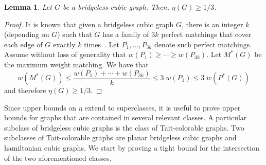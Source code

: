 \documentclass{article}
\newtheorem{lem}[thm]{Lemma}
\begin{document}
\begin{lem} \label{lem:lb}
Let $G$ be a bridgeless cubic graph. Then, $\eta(G) \geq 1/3$.
\end{lem}
\begin{proof}
It is known that given a bridgeless cubic graph $G$, there is an integer $k$ (depending on $G$) such that $G$ has a family of $3k$ perfect matchings that cover each edge of $G$ exactly $k$ times~\cite{edmonds65}. Let $P_1,\ldots,P_{3k}$ denote such perfect matchings. Assume without loss of generality that $w(P_1) \geq \cdots \geq w(P_{3k})$. Let $M^*(G)$ be the maximum weight matching. We have that
\[w(M^*(G)) \leq \frac{w(P_1) + \cdots + w(P_{3k})}{k} \leq 3\;w(P_1) \leq 3\;w(P^{*}(G))\]
and therefore $\eta(G) \geq 1/3$.
\end{proof}

Since upper bounds on $\eta$ extend to superclasses, it is useful to prove upper bounds for graphs that are contained in several relevant classes. A particular subclass of bridgeless cubic graphs is the class of Tait-colorable graphs. Two subclasses of Tait-colorable graphs are planar bridgeless cubic graphs and hamiltonian cubic graphs. We start by proving a tight bound for the intersection of the two aforementioned classes.
\end{document}
